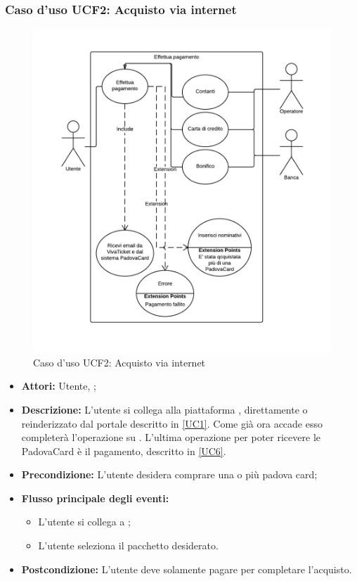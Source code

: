 \subsubsection{Caso d'uso UCF2: Acquisto via internet}
\begin{figure}[H]
\centering
\includegraphics[width=1\textwidth]{images/UCF2.png}
\caption{Caso d'uso UCF2: Acquisto via internet}
\end{figure}
\begin{itemize}
\item \textbf{Attori:} Utente, \charta;
\item \textbf{Descrizione:} L'utente si collega alla piattaforma \vivaticket, direttamente o reinderizzato dal portale descritto in \ref{UC1}. Come già ora accade esso completerà l'operazione su \vivaticket. L'ultima operazione per poter ricevere le PadovaCard è il pagamento, descritto in \ref{UC6}.
\item \textbf{Precondizione:} L'utente desidera comprare una o più padova card;
\item \textbf{Flusso principale degli eventi:}
	\begin{itemize}
		\item L'utente si collega a \vivaticket;
		\item L'utente seleziona il pacchetto desiderato.
	\end{itemize}
\item \textbf{Postcondizione:} L'utente deve solamente pagare per completare l'acquisto.
\end{itemize}

